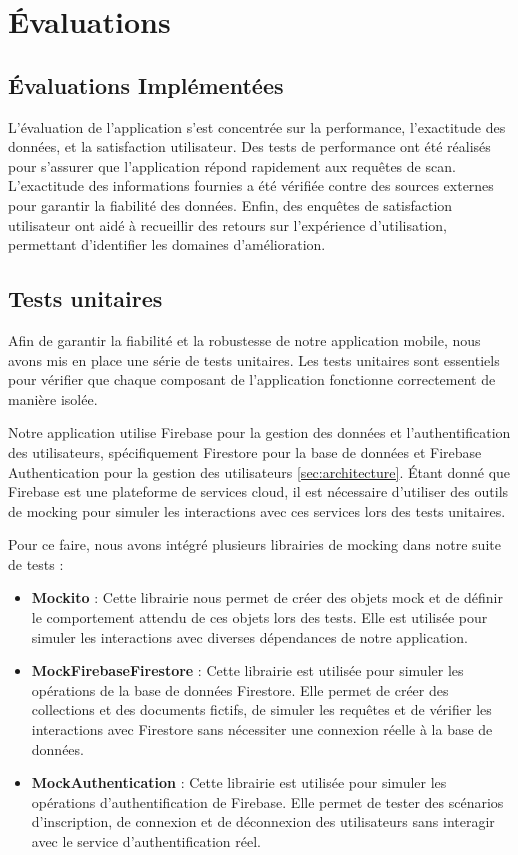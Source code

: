 \section{Évaluations}
\subsection{Évaluations Implémentées}

L'évaluation de l'application s'est concentrée sur la performance, l'exactitude des données, et la satisfaction utilisateur. Des tests de performance ont été réalisés pour s'assurer que l'application répond rapidement aux requêtes de scan. L'exactitude des informations fournies a été vérifiée contre des sources externes pour garantir la fiabilité des données. Enfin, des enquêtes de satisfaction utilisateur ont aidé à recueillir des retours sur l'expérience d'utilisation, permettant d'identifier les domaines d'amélioration.

\subsection{Tests unitaires}

Afin de garantir la fiabilité et la robustesse de notre application mobile, nous avons mis en place une série de tests unitaires. Les tests unitaires sont essentiels pour vérifier que chaque composant de l'application fonctionne correctement de manière isolée.

Notre application utilise Firebase pour la gestion des données et l'authentification des utilisateurs, spécifiquement Firestore pour la base de données et Firebase Authentication pour la gestion des utilisateurs \ref{sec:architecture}. Étant donné que Firebase est une plateforme de services cloud, il est nécessaire d'utiliser des outils de mocking pour simuler les interactions avec ces services lors des tests unitaires.

Pour ce faire, nous avons intégré plusieurs librairies de mocking dans notre suite de tests :

\begin{itemize}
    \item \textbf{Mockito} : Cette librairie nous permet de créer des objets mock et de définir le comportement attendu de ces objets lors des tests. Elle est utilisée pour simuler les interactions avec diverses dépendances de notre application.
    \item \textbf{MockFirebaseFirestore} : Cette librairie est utilisée pour simuler les opérations de la base de données Firestore. Elle permet de créer des collections et des documents fictifs, de simuler les requêtes et de vérifier les interactions avec Firestore sans nécessiter une connexion réelle à la base de données.
    \item \textbf{MockAuthentication} : Cette librairie est utilisée pour simuler les opérations d'authentification de Firebase. Elle permet de tester des scénarios d'inscription, de connexion et de déconnexion des utilisateurs sans interagir avec le service d'authentification réel.
\end{itemize}

